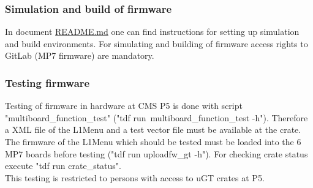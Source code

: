 

\clearpage

\subsubsection{Simulation and build of firmware}
\label{sec:fw:sim_build_firmware}

In document \href{https://github.com/cms-l1-globaltrigger/mp7_ugt_legacy/blob/master/README.md}{README.md} one can find instructions for setting up simulation and build environments. For simulating and building of firmware access rights to GitLab (MP7 firmware) are mandatory.

\subsubsection{Testing firmware}
\label{sec:fw:testing_firmware}

Testing of firmware in hardware at CMS P5 is done with script "multiboard\_function\_test" ("tdf run\ multiboard\_function\_test -h"). Therefore a XML file of the L1Menu and a test vector file must be available at the crate. The firmware of the L1Menu which should be tested must be loaded into the 6 MP7 boards before testing ("tdf run uploadfw\_gt -h"). For checking crate status execute "tdf run crate\_status".\\
This testing is restricted to persons with access to uGT crates at P5.

\clearpage
